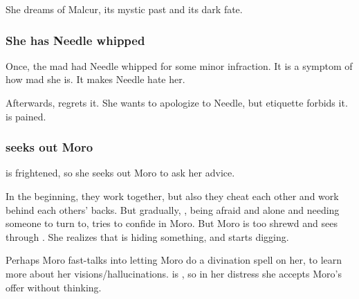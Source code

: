 \begin{garbage}

She dreams of Malcur, its mystic past and its dark fate. 






\subsubsection{She has Needle whipped}
Once, the mad \Tiroco{} had Needle whipped for some minor infraction. 
It is a symptom of how mad she is. 
It makes Needle hate her. 

Afterwards, \Tiroco{} regrets it. 
She wants to apologize to Needle, but etiquette forbids it. 
\Tiroco{} is pained. 





\subsubsection{\Tiroco{} seeks out Moro}
\Tiroco{} is frightened, so she seeks out Moro \Cornel{} to ask her advice. 

In the beginning, they work together, but also they cheat each other and work behind each others' backs. But gradually, \Tiroco{}, being afraid and alone and needing someone to turn to, tries to confide in Moro. But Moro is too shrewd and sees through \Tiroco. She realizes that \Tiroco{} is hiding something, and starts digging. 

Perhaps Moro fast-talks \Tiroco{} into letting Moro do a divination spell on her, to learn more about her visions/hallucinations. \Tiroco{} is , so in her distress she accepts Moro's offer without thinking.


\end{garbage}
